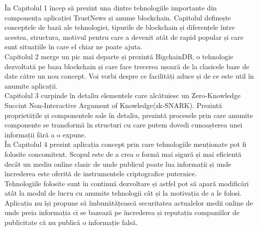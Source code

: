 În Capitolul 1 încep să prezint una dintre tehnologiile importante din componența aplicației TrustNews și anume blockchain. Capitolul definește conceptele de bază ale tehnologiei, tipurile de blockchain și diferențele între acestea, structura, motivul pentru care a devenit atât de rapid popular și care sunt situațiile în care el chiar ne poate ajuta.\\

Capitolul 2 merge un pic mai departe și prezintă BigchainDB, o tehnologie dezvoltată pe baza blockchain și care face trecerea ușoară de la clasicele baze de date către un nou concept. Voi vorbi despre ce facilități aduce și de ce este util în anumite aplicații.\\

Capitolul 3 curpinde în detaliu elementele care alcătuiesc un Zero-Knowledge Succint Non-Interactive Argument of Knowledge(zk-SNARK). Prezintă proprietățile și componentele sale în detaliu, prezintă procesele prin care anumite componente se transformă în structuri cu care putem dovedi cunoașterea unei informații fără a o expune.\\

În Capitolul 4 prezint aplicația concept prin care tehnologiile menționate pot fi folosite concomitent. Scopul este de a crea o formă mai sigură și mai eficientă decât un mediu online clasic de unde publicul poate lua informații și unde încrederea este oferită de instrumentele criptografice puternice.\\

Tehnologiile folosite sunt în continuă dezvoltare și astfel pot să apară modificări atât la modul de lucru cu anumite tehnologii cât și la motivația de a le folosi. Aplicația nu își propune să îmbunătățească securitatea actualelor medii online de unde preia informația ci se bazează pe încrederea și reputația companiilor de publicitate că nu publică o informație falsă.\\